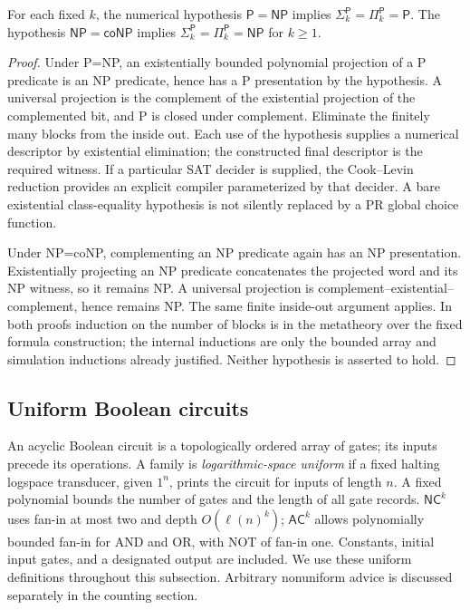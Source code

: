 \begin{theorem}\label{thm:A04}
For each fixed $k$, the numerical hypothesis $\mathsf P=\mathsf{NP}$ implies $\Sigma_k^{\mathsf P}=\Pi_k^{\mathsf P}=\mathsf P$. The hypothesis $\mathsf{NP}=\mathsf{coNP}$ implies $\Sigma_k^{\mathsf P}=\Pi_k^{\mathsf P}=\mathsf{NP}$ for $k\ge1$.
\end{theorem}
\begin{proof}
Under P=NP, an existentially bounded polynomial projection of a P predicate is an NP predicate, hence has a P presentation by the hypothesis. A universal projection is the complement of the existential projection of the complemented bit, and P is closed under complement. Eliminate the finitely many blocks from the inside out. Each use of the hypothesis supplies a numerical descriptor by existential elimination; the constructed final descriptor is the required witness. If a particular SAT decider is supplied, the Cook--Levin reduction provides an explicit compiler parameterized by that decider. A bare existential class-equality hypothesis is not silently replaced by a PR global choice function.

Under NP=coNP, complementing an NP predicate again has an NP presentation. Existentially projecting an NP predicate concatenates the projected word and its NP witness, so it remains NP. A universal projection is complement--existential--complement, hence remains NP. The same finite inside-out argument applies. In both proofs induction on the number of blocks is in the metatheory over the fixed formula construction; the internal inductions are only the bounded array and simulation inductions already justified. Neither hypothesis is asserted to hold.
\end{proof}

\subsection{Uniform Boolean circuits}
An acyclic Boolean circuit is a topologically ordered array of gates; its inputs precede its operations. A family is \emph{logarithmic-space uniform} if a fixed halting logspace transducer, given $1^n$, prints the circuit for inputs of length $n$. A fixed polynomial bounds the number of gates and the length of all gate records. $\mathsf{NC}^k$ uses fan-in at most two and depth $O(\ell(n)^k)$; $\mathsf{AC}^k$ allows polynomially bounded fan-in for AND and OR, with NOT of fan-in one. Constants, initial input gates, and a designated output are included. We use these uniform definitions throughout this subsection. Arbitrary nonuniform advice is discussed separately in the counting section.

